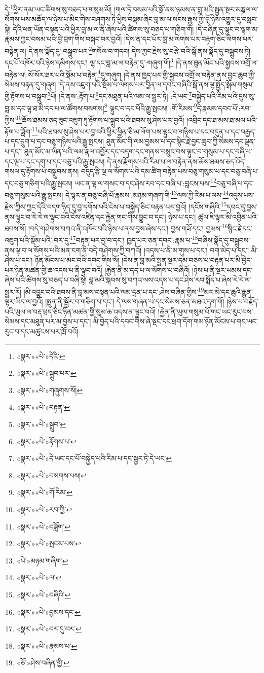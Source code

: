 དེ་\footnote{«སྣར་»«པེ་»དེའི་}ཕྱིར་ནམ་ཡང་ཚིགས་སུ་བཅད་པ་གསུམ་མོ། །གལ་ཏེ་བསམ་པའི་སྒོ་ནས་ཉམས་ན་བླ་མའི་སྤྱན་སྔར་མཎྜལ་ལ་སོགས་པས་མཆོད་ལ་ཉེས་པ་མིང་གིས་བཤགས་ཏེ་ཕྱིས་བསྡམ་ཞིང་བླ་མ་ལ་སངས་རྒྱས་ཀྱི་བློ་ཉིས་འགྱུར་དུ་བསླབ་སྟེ། དེའི་ཕན་ཡོན་བསྟན་པའི་ཕྱིར་བླ་མ་ལ་ནི་ཞེས་པའི་ཚིགས་སུ་བཅད་པ་གཅིག་གོ། །དེ་བཞིན་དུ་ལྟུང་བ་ལྷག་མ་རྣམས་ཀྱང་བསམ་པའི་བྱེ་བྲག་གིས་བསྐང་བར་བྱའོ། །དེས་ན་དང་པོར་བླ་མ་ལེགས་པར་བརྟག་ཅིང་ལེགས་པར་བསྟེན་ལ། དེ་ནས་སྣོད་དུ་:བསྒྲུབ་པར་\footnote{«སྣར་»«པེ་»སྒྲུབ་པར་}གསོལ་བ་གདབ། དེས་ཀྱང་རྗེས་སུ་བརྩེ་བའི་སྒོ་ནས་སྣོད་དུ་བསྒྲུབས་ཏེ། དང་པོ་འཁོར་བའི་ཉེས་དམིགས་དང་། ལྷ་དང་བླ་མ་ལ་བརྟེན་དུ་:གཞུག་གོ།\footnote{«སྣར་»«པེ་»གཞུགས་སོ།} །དེ་ནས་ཐུན་མོང་པའི་སྐྱབས་འགྲོ་ལ་བརྟེན་ལ། སོ་སོར་ཐར་པའི་སྡོམ་པ་བརྟེན་\footnote{«སྣར་»«པེ་»བརྟན་}དུ་གཞུག །དེ་ནས་ཁྱད་པར་གྱི་སྐྱབས་འགྲོ་ལ་བརྟེན་ནས་བྱང་ཆུབ་ཀྱི་སེམས་བརྟན་དུ་གཞུག །དེ་ནས་འཇུག་པའི་སྡོམ་པ་ལེགས་པར་བྱིན་ལ་དབང་བཞིའི་སྒོ་ནས་ལྟ་སྤྱོད་སྒོམ་གསུམ་གྱི་རྟོགས་པ་བསྒྲུབ་\footnote{«སྣར་»«པེ་»སྒྲུབ་}པོ། །དེ་ནས་:རྟོག་པ་\footnote{«སྣར་»«པེ་»རྟོགས་པ་}དང་མཐུན་པའི་ལམ་ལ་སྦྱར་ཏེ། :དེ་ཡང་\footnote{«སྣར་»«པེ་»དེ་ཡང་དང་པོ་བསྐྱེད་པའི་རིམ་པ་དང་སྦྱར་ཏེ་དེ་ཡང་}བསྐྱེད་པའི་རིམ་པའི་དུས་སུ་བླ་མ་དང་ལྷ་ཐ་མི་དད་པ་ལ་ཚོགས་བསགས།\footnote{«སྣར་»«པེ་»བསགས་པས།} ལྟུང་བ་དང་པོའི་རྒྱུ་སྤངས། :གོ་རིམས་\footnote{«སྣར་»«པེ་»གོ་རིམ་}དེ་རྣམས་དབང་པོ་:རབ་ཀྱིས་\footnote{«སྣར་»«པེ་»རབ་ཀྱི་}ཆོས་ཐམས་ཅད་ཟུང་འཇུག་ཏུ་རྟོགས་པ་སྒྲུབ་པའི་ཐབས་སུ་ཤེས་པར་བྱའོ། །འབྲིང་དང་ཐ་མས་ཐ་མལ་པའི་རྟོག་པ་ཟློག་\footnote{«སྣར་»«པེ་»བཟློག་}པའི་ཐབས་སུ་ཤེས་པར་བྱ་བའི་ཕྱིར་ཕྱིན་ཅི་མ་ལོག་པས་ལྟུང་བ་གཉིས་པ་དང་བདུན་པ་དང་བརྒྱད་པ་དང་དྲུག་པ་དང་བཅུ་གཉིས་པའི་རྒྱུ་སྤངས། ཐུན་མོང་གི་ལམ་བྱམས་པ་དང་སྙིང་རྗེ་བྱང་ཆུབ་ཀྱི་སེམས་དང་ལྡན་པ་དང་། ཐུན་མོང་མ་ཡིན་པའི་ལམ་རྣལ་འབྱོར་དང་བདག་དང་གནས་བསྲུང་བས་ལྟུང་བ་གསུམ་པ་དང་བཞི་པ་དང་ལྔ་པ་དང་དགུ་པ་དང་བཅུ་པའི་རྒྱུ་སྤངས། དེ་ནས་རྫོགས་པའི་རིམ་པ་ལ་བརྟེན་ནས་ཆོས་ཐམས་ཅད་འོད་གསལ་དུ་རྟོགས་པ་བསྒྲུབས་ནས། བདུད་རྩི་ལྔ་ལ་སོགས་པའི་དམ་ཚིག་བརྟེན་པས་བཅུ་གསུམ་པ་དང་བཅུ་བཞི་པ་དང་བཅུ་གཅིག་པའི་རྒྱུ་སྤངས། ཡང་ན་ལྷ་ལ་གསང་བ་དང་ཤེས་རབ་དང་བཞི་པ་:བླངས་པས་\footnote{«སྣར་»«པེ་»སྤངས་པས་}བཅུ་བཞི་པ་དང་བཅུ་གསུམ་པའི་རྒྱུ་སྤངས། དེ་ལྟར་ན་བཅུ་བཞི་པོ་རྣམས་:མཉམ་གཞག་གི་\footnote{«པེ་»མཉམ་གཞིག་}ལས་ཀྱི་རིམ་པ་ལས་\footnote{«སྣར་»«པེ་»ལ་}འདུས་པས་རྗེས་ཀྱིས་ཀྱང་དེའི་བདག་ཉིད་དུ་བྱ་དགོས་པའི་ངེས་པ་བསྐྱེད་ཅིང་བརྟན་པར་བྱའོ། །དངོས་གཞིའི་\footnote{«སྣར་»«པེ་»བཞིའི་}དབང་དུ་བྱས་ནས་ལྟུང་བ་རེ་རེ་ལ་ལྟུང་བའི་ངོས་འཛིན་དང་རྐྱེན་གང་གིས་བྱུང་བ་དང་། ཉེས་པ་དང་། ཚུལ་ཇི་ལྟར་མི་འབྱིན་པའི་ཐབས་སོ། །བདེ་གཤེགས་བཀའ་ནི་འཁོར་བའི་ཉེས་པ་ནས་བྱས་ཞེས་དང་། བྱས་གཟོ་དང་། བྱམས་\footnote{«སྣར་»«པེ་»བྱམས་དང་}སྙིང་རྗེ་དང་འཇུག་པའི་སྡོམ་པའི་:བར་དུ་\footnote{«སྣར་»«པེ་»བར་དུ་བར་}བརྟན་པར་བྱ་བ་དང་། ཁྱད་པར་ཅན་དབང་:རྣམ་པ་\footnote{«སྣར་»«པེ་»རྣམས་པ་}བཞིས་སྣོད་དུ་བསྒྲུབས་ནས་ལྟ་བ་ལ་སོགས་པའི་མན་ངག་ནི་བདེ་གཤེགས་ཀྱི་བཀའོ། །འདས་པ་ནི་མ་གུས་པ་དང་། བག་མེད་པ་དང་། མི་ཤེས་པ་དང་། ཉོན་མོངས་པ་མང་བའི་དབང་གིས་སོ། །དེས་ན་བླ་མའི་སྤྱན་སྔར་དམ་བཅས་པ་བརྟན་པར་མི་བྱེད་པར་ཉིན་མཚན་གྱི་ཆ་འདས་པ་ནི་ལྟུང་བའོ། །རྐྱེན་ནི་མ་དད་པ་ལ་སོགས་པ་བཞིའོ། །ཉེས་པ་ནི་སྔར་ཡམས་དང་ཞེས་པའི་ཚིགས་སུ་བཅད་པ་བཞི་སྟེ། བླ་མའི་སྐབས་སུ་བཀའ་ལས་འདས་པ་དང་ཤེས་རབ་སྨོད་པ་ཞེས་རེ་རེ་ལ་སྦྱར་རོ། །མི་འབྱུང་བའི་ཐབས་ནི་བླ་མས་བསྟན་པའི་ལམ་དྲན་པ་དང་:ཤེས་བཞིན་གྱིས་\footnote{«ཅོ་»ཤེས་བཞིན་གྱི་}མར་མེ་དང་ཆུའི་རྒྱུན་ལྟར་ཡིད་ལ་བྱའོ། །སྤུན་ནི་སྦྱོར་བ་གཅིག་པ་དང་། དེ་ལས་གཞན་པ་དང་སེམས་ཅན་མཐའ་དག་གོ། །ཉེས་པ་བརྗོད་པའི་ཡུལ་ལ་བརྡ་ཕྲད་ཅིང་ཉིན་མཚན་གྱི་སུམ་ཆ་འདས་ན་ལྟུང་བའོ། །རྐྱེན་ནི་ཡུལ་གསུམ་པོ་གང་ཡང་རུང་བས་སེམས་དང་མཐུན་པར་མ་བྱས་པ་དང་། མི་བྱེད་པའི་དབང་གིས་ཞེ་སྡང་དང་ཕྲག་དོག་གམ་ཉོན་མོངས་པ་གང་ཡང་རུང་བ་དང་མཚུངས་པར་ཁྲོ་བའོ། 
